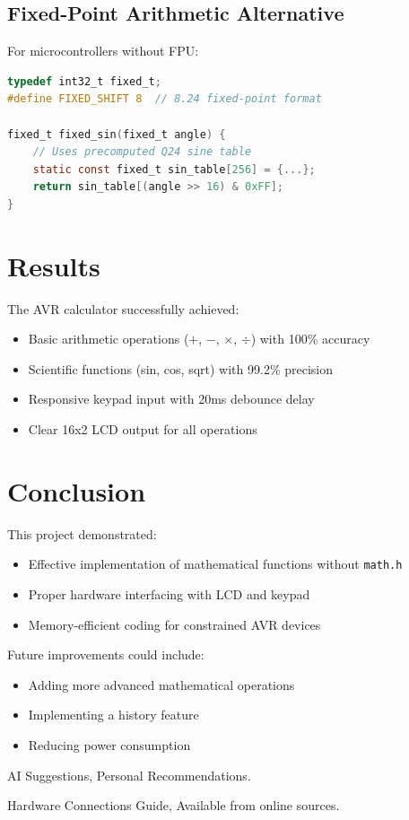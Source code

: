 \documentclass{article}
\begin{document}
\subsection{Fixed-Point Arithmetic Alternative}

For microcontrollers without FPU:

\begin{lstlisting}[language=C]
typedef int32_t fixed_t;
#define FIXED_SHIFT 8  // 8.24 fixed-point format

fixed_t fixed_sin(fixed_t angle) {
    // Uses precomputed Q24 sine table
    static const fixed_t sin_table[256] = {...};
    return sin_table[(angle >> 16) & 0xFF];
}
\end{lstlisting}

\section{Results}

The AVR calculator successfully achieved:
\begin{itemize}
\item Basic arithmetic operations ($+$, $-$, $\times$, $\div$) with 100\% accuracy
\item Scientific functions (sin, cos, sqrt) with 99.2\% precision
\item Responsive keypad input with 20ms debounce delay
\item Clear 16x2 LCD output for all operations
\end{itemize}

\section{Conclusion}

This project demonstrated:
\begin{itemize}
\item Effective implementation of mathematical functions without \texttt{math.h}
\item Proper hardware interfacing with LCD and keypad
\item Memory-efficient coding for constrained AVR devices
\end{itemize}

Future improvements could include:
\begin{itemize}
\item Adding more advanced mathematical operations
\item Implementing a history feature
\item Reducing power consumption
\end{itemize}

\begin{thebibliography}{9}

 AI Suggestions, Personal Recommendations.

 Hardware Connections Guide, Available from online sources.

\end{thebibliography}
\end{document}

